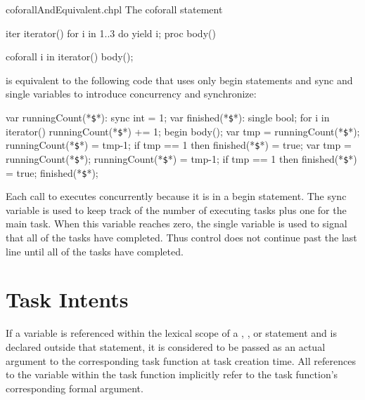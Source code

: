 \begin{chapelexample}{coforallAndEquivalent.chpl}
The coforall statement
\begin{chapelpre}
iter iterator() { for i in 1..3 do yield i; }
proc body() { }
\end{chapelpre}
\begin{chapel}
coforall i in iterator() {
  body();
}
\end{chapel}
is equivalent to the following code that uses only begin statements
and sync and single variables to introduce concurrency and
synchronize:
\begin{chapel}
var runningCount(*\texttt{\$}*): sync int = 1;
var finished(*\texttt{\$}*): single bool;
for i in iterator() {
  runningCount(*\texttt{\$}*) += 1;
  begin {
    body();
    var tmp = runningCount(*\texttt{\$}*);
    runningCount(*\texttt{\$}*) = tmp-1;
    if tmp == 1 then finished(*\texttt{\$}*) = true;
  }
}
var tmp = runningCount(*\texttt{\$}*);
runningCount(*\texttt{\$}*) = tmp-1;
if tmp == 1 then finished(*\texttt{\$}*) = true;
finished(*\texttt{\$}*);
\end{chapel}
\begin{chapeloutput}
\end{chapeloutput}
Each call to  executes concurrently because it is in a
begin statement.  The sync
variable  is used to keep track
of the number of executing tasks plus one for the main task.  When
this variable reaches zero, the single
variable  is used to signal that
all of the tasks have completed.  Thus control does not continue past
the last line until all of the tasks have completed.
\end{chapelexample}


\section{Task Intents}
\label{Task_Intents}

If a variable is referenced within the lexical scope of a
, , or  statement
and is declared outside that statement, it is considered
to be passed as an actual argument to the corresponding task function
at task creation time. All references to the variable
within the task function implicitly refer to the task function's
corresponding formal argument.

